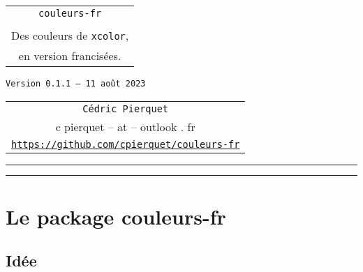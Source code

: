 \documentclass[french,11pt,a4paper]{article}
\def\TPversion{0.1.1}
\def\TPdate{11 août 2023}
\begin{document}
\pagestyle{fancy}

\thispagestyle{empty}

\begin{center}
	\begin{minipage}{0.75\linewidth}
	\begin{tcolorbox}[colframe=yellow,colback=yellow!15]
		\begin{center}
			\begin{tabular}{c}
				{\Huge \texttt{couleurs-fr}}\\
				\\
				{\LARGE Des couleurs de \texttt{xcolor},} \\
				{\LARGE en version francisées.} \\
			\end{tabular}
			
			\medskip
			
			{\small \texttt{Version \TPversion{} -- \TPdate}}
		\end{center}
	\end{tcolorbox}
\end{minipage}
\end{center}

\vspace*{1mm}

\begin{center}
	\begin{tabular}{c}
	\texttt{Cédric Pierquet}\\
	{\ttfamily c pierquet -- at -- outlook . fr}\\
	\texttt{\url{https://github.com/cpierquet/couleurs-fr}}
\end{tabular}
\end{center}

\hrule


\hypertarget{matoc}{}

\tableofcontents

\vspace*{5mm}

\hrule

\section{Le package couleurs-fr}

\subsection{Idée}
\end{document}
